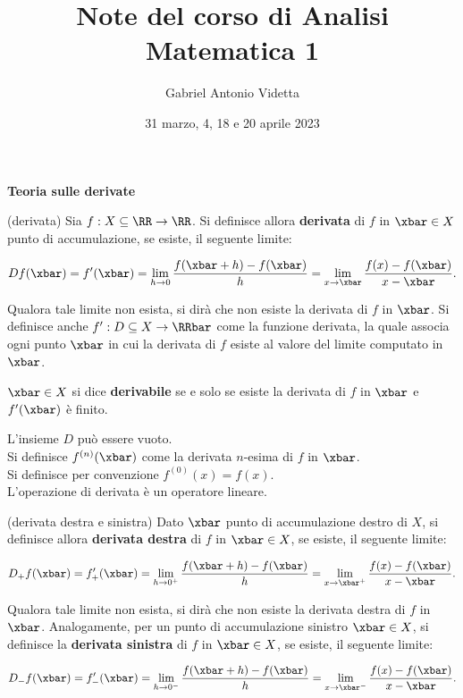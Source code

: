 \documentclass[11pt]{article}
\title{\textbf{Note del corso di Analisi Matematica 1}}
\author{Gabriel Antonio Videtta}
\date{31 marzo, 4, 18 e 20 aprile 2023}
\begin{document}
	
	\maketitle
	
	\begin{center}
		\Large \textbf{Teoria sulle derivate}
	\end{center}

	\begin{definition} (derivata)
		Sia $f : X \subseteq \RR \to \RR$. Si definisce allora \textbf{derivata}
		di $f$ in $\xbar \in X$ punto di accumulazione, se esiste, il seguente limite:
		
		\[Df(\xbar) = f'(\xbar) = \lim_{h \to 0} \frac{f(\xbar + h) - f(\xbar)}{h} = \lim_{x \to \xbar} \frac{f(x) - f(\xbar)}{x - \xbar}.\]
		
		\vskip 0.05in
		
		Qualora tale limite non esista, si dirà che non esiste la derivata
		di $f$ in $\xbar$. Si definisce anche $f' : D \subseteq X \to \RRbar$ come la funzione derivata,
		la quale associa ogni punto $\xbar$ in cui la derivata di $f$ esiste al
		valore del limite computato in $\xbar$.
	\end{definition}
	
	\begin{definition}
		$\xbar \in X$ si dice \textbf{derivabile} se e solo se esiste la
		derivata di $f$ in $\xbar$ e $f'(\xbar)$ è finito.
	\end{definition}
	
	\begin{remark}\nl
		\li L'insieme $D$ può essere vuoto. \\
		\li Si definisce $f^{(n)}(\xbar)$ come la derivata $n$-esima
		di $f$ in $\xbar$. \\
		\li Si definisce per convenzione $f^{(0)}(x) = f(x)$. \\
		\li L'operazione di derivata è un operatore lineare. \\
	\end{remark}

	\begin{definition} (derivata destra e sinistra)
		Dato $\xbar$ punto di accumulazione destro di $X$, si definisce
		allora \textbf{derivata destra} di $f$ in $\xbar \in X$, se
		esiste, il seguente limite:
		
		\[D_+ f(\xbar) = f_+'(\xbar) = \lim_{h \to 0^+} \frac{f(\xbar + h) - f(\xbar)}{h} = \lim_{x \to \xbar^+} \frac{f(x) - f(\xbar)}{x - \xbar}.\]
		
		\vskip 0.05in
		
		Qualora tale limite non esista, si dirà che non esiste la derivata destra di $f$ in $\xbar$. Analogamente, per un punto di accumulazione sinistro $\xbar \in X$, si definisce
		la \textbf{derivata sinistra} di $f$ in $\xbar \in X$, se esiste, il seguente
		limite:
		
		\[D_- f(\xbar) = f_-'(\xbar) = \lim_{h \to 0^-} \frac{f(\xbar + h) - f(\xbar)}{h} = \lim_{x \to \xbar^-} \frac{f(x) - f(\xbar)}{x - \xbar}.\]
	\end{definition}
\end{document}
